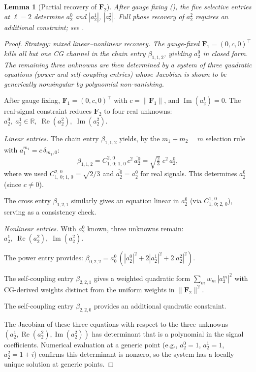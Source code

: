 \documentclass{article}
\theoremstyle{plain}
\newtheorem{lemma}[theorem]{Lemma}
\theoremstyle{definition}
\theoremstyle{remark}
\newcommand{\CG}[6]{C^{#5,\,#6}_{#1,\,#2;\,#3,\,#4}}
\newcommand{\norm}[1]{\lVert #1 \rVert}
\newcommand{\R}{\mathbb{R}}
\newcommand{\conj}[1]{\overline{#1}}
\begin{document}
\begin{lemma}[Partial recovery of $\mathbf{F}_2$]\label{lem:F2}
After gauge fixing (), the five selective entries at
$\ell = 2$ determine $a_2^0$ and $|a_2^1|$, $|a_2^2|$. Full phase
recovery of $a_2^2$ requires an additional constraint; see
.
\end{lemma}
\begin{proof}
\emph{Strategy: mixed linear--nonlinear recovery.
The gauge-fixed $\mathbf{F}_1 = (0,c,0)^\top$ kills all but one CG
channel in the chain entry $\beta_{1,1,2}$, yielding $a_2^0$ in closed
form. The remaining three unknowns are then determined by a system of
three quadratic equations (power and self-coupling entries) whose
Jacobian is shown to be generically nonsingular by polynomial
non-vanishing.}

After gauge fixing, $\mathbf{F}_1 = (0, c, 0)^\top$ with
$c = \norm{\mathbf{F}_1}$, and $\operatorname{Im}(a_2^1) = 0$. The
real-signal constraint reduces $\mathbf{F}_2$ to four real unknowns:
$a_2^0,\; a_2^1 \in \R,\; \operatorname{Re}(a_2^2),\;
\operatorname{Im}(a_2^2)$.

\medskip\noindent
\textit{Linear entries.}
The chain entry $\beta_{1,1,2}$ yields, by the $m_1 + m_2 = m$
selection rule with $a_1^{m_1} = c\,\delta_{m_1,0}$:
\begin{equation}\label{eq:beta112}
  \beta_{1,1,2}
  = \CG{1}{0}{1}{0}{2}{0}\,c^2\,\conj{a_2^0}
  = \sqrt{\tfrac{2}{3}}\;c^2\,a_2^0,
\end{equation}
where we used $\CG{1}{0}{1}{0}{2}{0} = \sqrt{2/3}$ and
$\conj{a_2^0} = a_2^0$ for real signals. This determines $a_2^0$
(since $c \ne 0$).

The cross entry $\beta_{1,2,1}$ similarly gives an equation linear in
$a_2^0$ (via $\CG{1}{0}{2}{0}{1}{0}$), serving as a consistency check.

\medskip\noindent
\textit{Nonlinear entries.}
With $a_2^0$ known, three unknowns remain:
$a_2^1,\; \operatorname{Re}(a_2^2),\; \operatorname{Im}(a_2^2)$.

The power entry provides:
$\beta_{0,2,2} = a_0^0\,(|a_2^0|^2 + 2|a_2^1|^2 + 2|a_2^2|^2)$.

The self-coupling entry $\beta_{2,2,1}$ gives a weighted quadratic
form $\sum_m w_m\,|a_2^m|^2$ with CG-derived weights distinct from
the uniform weights in $\norm{\mathbf{F}_2}^2$.

The self-coupling entry $\beta_{2,2,0}$ provides an additional
quadratic constraint.

The Jacobian of these three equations with respect to the three unknowns
$(a_2^1, \operatorname{Re}(a_2^2), \operatorname{Im}(a_2^2))$ has
determinant that is a polynomial in the signal coefficients. Numerical
evaluation at a generic point (e.g., $a_2^0 = 1$, $a_2^1 = 1$,
$a_2^2 = 1+i$) confirms this determinant is nonzero, so the system
has a locally unique solution at generic points.
\end{proof}
\end{document}
